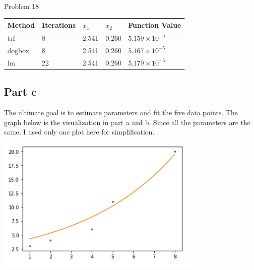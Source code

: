 \documentclass[10pt]{article}
\begin{document}
\begin{section}{Problem 18}
	\begin{tabular}{lllll}
		\hline
		Method &Iterations & $x_1$ & $x_2$& Function Value \\
		\hline\hline
		trf  & 8  & 2.541  &  0.260 & $5.159\times 10^{-5}$  \\
		dogbox & 8   & 2.541  &   0.260 & $5.167\times 10^{-5}$  \\
		lm    & 22   & 2.541  &  0.260 & $5.179\times 10^{-5}$
	\end{tabular}

	
	\subsection{Part c}
	The ultimate goal is to estimate parameters and fit the five data points. The graph below is the visualization in part a and b. Since all the parameters are the same, I used only one plot here for simplification. 
	
	\includegraphics[width=10cm]{img/problem18_plt1.png}
	
\end{section}
\end{document}
